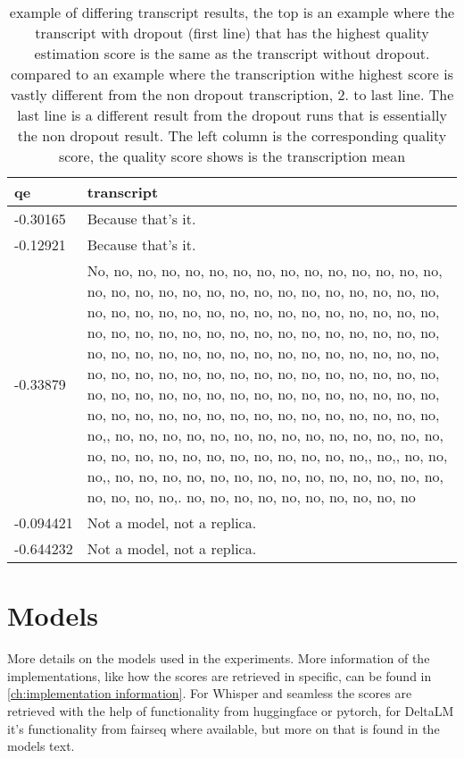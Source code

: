 \begin{table}[ht]
    \centering
    \begin{tabularx}{\textwidth}{l|X}
         qe& transcript \\\hline
         -0.30165& Because that's it. \\
         -0.12921& Because that's it.\\\hline
         -0.33879& No, no, no, no, no, no, no, no, no, no, no, no, no, no, no, no, no, no, no, no, no, no, no, no, no, no, no, no, no, no, no, no, no, no, no, no, no, no, no, no, no, no, no, no, no, no, no, no, no, no, no, no, no, no, no, no, no, no, no, no, no, no, no, no, no, no, no, no, no, no, no, no, no, no, no, no, no, no, no, no, no, no, no, no, no, no, no, no, no, no, no, no, no, no, no, no, no, no, no, no, no, no, no, no, no, no, no, no, no, no, no, no, no, no, no, no, no, no, no, no, no,, no, no, no, no, no, no, no, no, no, no, no, no, no, no, no, no, no, no, no, no, no, no, no, no, no, no,, no,, no, no, no,, no, no, no, no, no, no, no, no, no, no, no, no, no, no, no, no, no, no,. no, no, no, no, no, no, no, no, no, no\\
         -0.094421 &Not a model, not a replica.\\
         -0.644232&  Not a model, not a replica.
    \end{tabularx}
    \caption{example of differing transcript results, the top is an example where the transcript with dropout (first line) that has the highest quality estimation score is the same as the transcript without dropout. compared to an example where the transcription withe highest score is vastly different from the non dropout transcription, 2. to last line. The last line is a different result from the dropout runs that is essentially the non dropout result. The left column is the corresponding quality score, the quality score shows is the transcription mean}
    \label{tab:transcriptshift}
\end{table}



\section{Models}
More details on the models used in the experiments. More information of the implementations, like how the scores are retrieved in specific, can be found in \autoref{ch:implementation information}. For Whisper and seamless the scores are retrieved with the help of functionality from huggingface or pytorch, for DeltaLM it's functionality from fairseq where available, but more on that is found in the models text.

